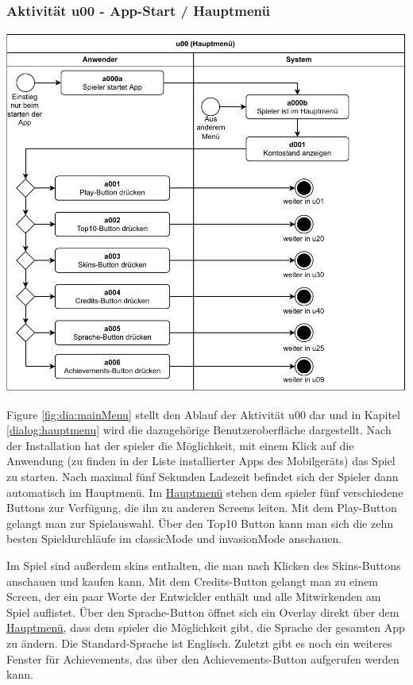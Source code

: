 

\subsubsection{Aktivität u00 - App-Start / Hauptmenü}
\vspace*{1cm}

\includegraphics[width=\linewidth]{diagramme/pdf/UML-Activity-u00.pdf}
\label{fig:dia:mainMenu}
\vspace*{0.5cm}

Figure \ref{fig:dia:mainMenu} stellt den Ablauf der Aktivität u00 dar und in Kapitel \ref{dialog:hauptmenu} wird die dazugehörige Benutzeroberfläche dargestellt. Nach der Installation hat der \gls{spieler} die Möglichkeit, mit einem Klick auf die Anwendung (zu finden in der Liste installierter Apps des Mobilgeräts) das Spiel zu starten. 
Nach maximal fünf Sekunden Ladezeit befindet sich der Spieler dann automatisch im Hauptmenü. Im \hyperref[fig:dia:mainMenu]{Hauptmenü} stehen dem \gls{spieler} fünf verschiedene Buttons zur Verfügung, die ihn zu anderen Screens leiten. Mit dem Play-Button gelangt man zur Spielauswahl. Über den \gls{Top10} Button kann man sich die zehn besten Spiel\-durch\-läufe im \gls{classicMode} und \gls{invasionMode} anschauen.

\vspace{1em}

Im Spiel sind außerdem \glspl{skin} enthalten, die man nach Klicken des Skins-Buttons anschauen und kaufen kann. Mit dem Credits-Button gelangt man zu einem Screen, der ein paar Worte der Entwickler enthält und alle Mitwirkenden am Spiel auflistet. Über den Sprache-Button öffnet sich ein Overlay direkt über dem \hyperref[fig:dia:mainMenu]{Hauptmenü}, dass dem \gls{spieler} die Möglichkeit gibt, die Sprache der gesamten App zu ändern. Die Standard-Sprache ist Englisch. Zuletzt gibt es noch ein weiteres Fenster für Achievements, das über den Achievements-Button aufgerufen werden kann.


